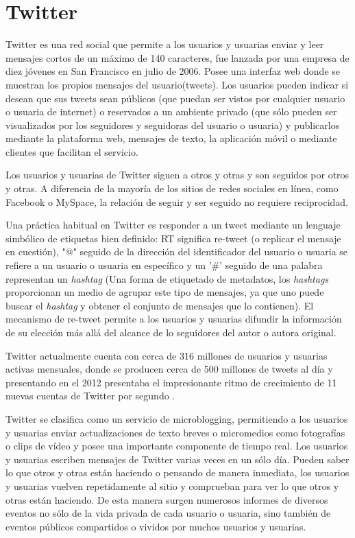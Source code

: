 \section{Twitter}

Twitter es una red social que permite a los usuarios y usuarias enviar y leer mensajes cortos de un máximo de 140 caracteres, fue lanzada por una empresa de diez jóvenes en San Francisco en julio de 2006. Posee una interfaz web donde se muestran los propios mensajes del usuario(tweets). Los usuarios pueden indicar si desean que sus tweets sean públicos (que puedan ser vistos por cualquier usuario o usuaria de internet) o reservados a un ambiente privado (que sólo pueden ser visualizados por los seguidores y seguidoras del usuario o usuaria) y publicarlos mediante la plataforma web, mensajes de texto, la aplicación móvil o mediante clientes que facilitan el servicio.

Los usuarios y usuarias de Twitter siguen a otros y otras y son seguidos por otros y otras. A diferencia de la mayoría de los sitios de redes sociales en línea, como Facebook o MySpace, la relación de seguir y ser seguido no requiere reciprocidad. 

Una práctica habitual en Twitter es responder a un tweet mediante un lenguaje simbólico de etiquetas bien definido: RT significa re-tweet (o replicar el mensaje en cuestión), "@" seguido de la dirección del identificador del usuario o usuaria se refiere a un usuario o usuaria en específico y un '\#' seguido de una palabra representan un \emph{hashtag} (Una forma de etiquetado de metadatos, los \emph{hashtags} proporcionan un medio de agrupar este tipo de mensajes, ya que uno puede buscar el \emph{hashtag} y obtener el conjunto de mensajes que lo contienen). El mecanismo de re-tweet permite a los usuarios y usuarias difundir la información de su elección más allá del alcance de lo seguidores del autor o autora original.

Twitter actualmente cuenta con cerca de 316 millones de usuarios y usuarias activas mensuales, donde se producen cerca de 500 millones de tweets al día \cite{cifrasTwitter} y presentando en el 2012 presentaba el impresionante ritmo de crecimiento de 11 nuevas cuentas de Twitter por segundo \cite{infografiasLabs}.

Twitter se clasifica como un servicio de microblogging, permitiendo a los usuarios y usuarias enviar actualizaciones de texto breves o micromedios como fotografías o clips de vídeo y posee una importante componente de tiempo real. Los usuarios y usuarias escriben mensajes de Twitter varias veces en un sólo día. Pueden saber lo que otros y otras están haciendo o pensando de manera inmediata, los usuarios y usuarias vuelven repetidamente al sitio y comprueban para ver lo que otros y otras están haciendo. De esta manera surgen numerosos informes de diversos eventos no sólo de la vida privada de cada usuario o usuaria, sino también de eventos públicos compartidos o vividos por muchos usuarios y usuarias.

